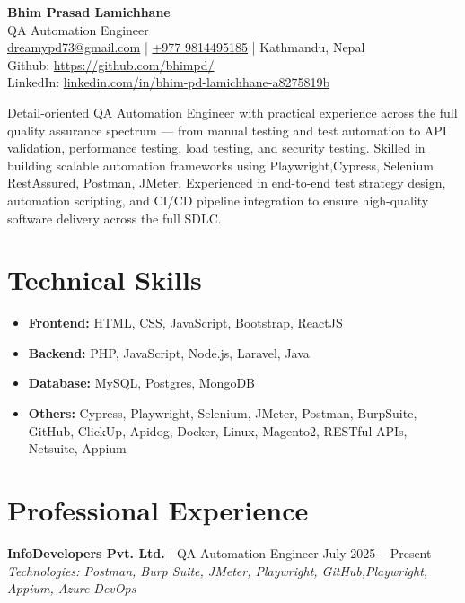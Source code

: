 \documentclass[a4paper,10pt]{article}
\begin{document}
\begin{center}
    {\LARGE \textbf{Bhim Prasad Lamichhane}} \\[0.5em]
    \small { QA Automation Engineer} \\[0.5em]
    \href{mailto:dreamypd73@gmail.com}{dreamypd73@gmail.com} |
    \href{tel:+9779814495185}{+977 9814495185} | Kathmandu, Nepal \\[0.5em]
 
    Github: \href{https://github.com/bhimpd/}{https://github.com/bhimpd/} \\
    LinkedIn: \href{https://www.linkedin.com/in/bhim-pd-lamichhane-a8275819b/}{linkedin.com/in/bhim-pd-lamichhane-a8275819b}
\end{center}

\noindent Detail-oriented QA Automation Engineer with practical experience across the full quality assurance spectrum — from manual testing and test automation to API validation, performance testing, load testing, and security testing. Skilled in building scalable automation frameworks using Playwright,Cypress, Selenium RestAssured, Postman, JMeter. Experienced in end-to-end test strategy design, automation scripting, and CI/CD pipeline integration to ensure high-quality software delivery across the full SDLC.

\section*{Technical Skills}
\begin{itemize}
    \item \textbf{Frontend:} HTML, CSS, JavaScript, Bootstrap, ReactJS
    \item \textbf{Backend:} PHP, JavaScript, Node.js, Laravel, Java
    \item \textbf{Database:} MySQL, Postgres, MongoDB
    \item \textbf{Others:} Cypress, Playwright, Selenium, JMeter, Postman, BurpSuite, GitHub, ClickUp, Apidog, Docker, Linux, Magento2, RESTful APIs, Netsuite, Appium
\end{itemize}

\section*{Professional Experience}

\textbf{InfoDevelopers Pvt. Ltd.} | QA Automation Engineer \hfill July 2025 -- Present \\
\textit{Technologies: Postman, Burp Suite, JMeter, Playwright, GitHub,Playwright, Appium, Azure DevOps}
\end{document}
